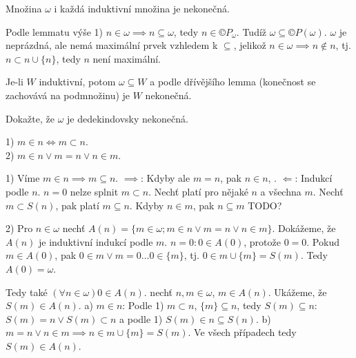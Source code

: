 \documentclass[12pt]{article}                   %
\begin{document}

    \begin{lemma}
        Množina $\omega$ i každá induktivní množina je nekonečná.

        \begin{dukazin}
            Podle lemmatu výše 1) $n \in \omega \implies n \subseteq \omega$, tedy $n \in ©P_{\omega}$. Tudíž $\omega \subseteq ©P(\omega)$. $\omega$ je neprázdná, ale nemá maximální prvek vzhledem k $\subseteq$, jelikož $n \in \omega \implies n \notin n$, tj. $n \subset n \cup \{n\}$, tedy $n$ není maximální.

            Je-li $W$ induktivní, potom $\omega \subseteq W$ a podle dřívějšího lemma (konečnost se zachovává na podmnožinu) je $W$ nekonečná.
        \end{dukazin}
    \end{lemma}

    \begin{priklad}[Cvičení]
        Dokažte, že $\omega$ je dedekindovsky nekonečná.
    \end{priklad}

    \begin{lemma}
        1) $m \in n \Leftrightarrow m \subset n$.\\
        2) $m \in n \lor m = n \lor n \in m$.

        \begin{dukazin}
            1) Víme $m \in n \implies m \subseteq n$. $\implies$: Kdyby ale $m = n$, pak $n \in n$, \lightning. $\Leftarrow$: Indukcí podle $n$. $n = 0$ nelze splnit $m \subset n$. Nechť platí pro nějaké $n$ a všechna $m$. Nechť $m \subset S(n)$, pak platí $m \subseteq n$. Kdyby $n \in m$, pak $n \subseteq m$ TODO?

            2) Pro $n \in \omega$ nechť $A(n) = \{m \in \omega; m \in n \lor m = n \lor n \in m\}$. Dokážeme, že $A(n)$ je induktivní indukcí podle $m$. $n = 0: 0 \in A(0)$, protože $0 = 0$. Pokud $m \in A(0)$, pak $0 \in m \lor m = 0…0 \in \{m\}$, tj. $0 \in m \cup \{m\} = S(m)$. Tedy $A(0) = \omega$.

            Tedy také $(\forall n \in \omega) 0 \in A(n)$. nechť $n, m \in \omega$, $m \in A(n)$. Ukážeme, že $S(m) \in A(n)$. a) $m \in n$: Podle 1) $m \subset n$, $\{m\} \subseteq n$, tedy $S(m) \subseteq n$: $S(m) = n \lor S(m) \subset n$ a podle 1) $S(m) \in n \subseteq S(n)$. b) $m = n \lor n \in m \implies n \in m \cup \{m\} = S(m)$. Ve všech případech tedy $S(m) \in A(n)$.
        \end{dukazin}
    \end{lemma}
\end{document}
